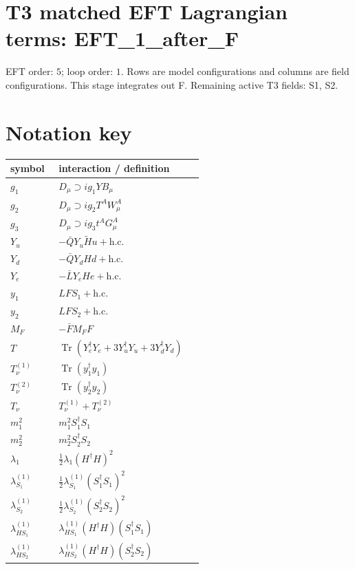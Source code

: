 \documentclass[8pt]{article}
\begin{document}
\begin{landscape}
\section*{T3 matched EFT Lagrangian terms: EFT\_1\_after\_F}
EFT order: $5$; loop order: $1$. 
Rows are model configurations and columns are field configurations. This stage integrates out F. Remaining active T3 fields: S1, S2.
\section*{Notation key}
\begin{longtable}{@{}p{0.23\linewidth}p{0.69\linewidth}@{}}
\toprule
symbol & interaction / definition \\
\midrule
$g_1$ & $D_\mu\supset i g_1YB_\mu$ \\
$g_2$ & $D_\mu\supset i g_2T^AW_\mu^A$ \\
$g_3$ & $D_\mu\supset i g_3t^AG_\mu^A$ \\
$Y_u$ & $-\bar QY_u\widetilde Hu+\mathrm{h.c.}$ \\
$Y_d$ & $-\bar QY_dHd+\mathrm{h.c.}$ \\
$Y_e$ & $-\bar LY_eHe+\mathrm{h.c.}$ \\
$y_1$ & $LFS_1+\mathrm{h.c.}$ \\
$y_2$ & $LFS_2+\mathrm{h.c.}$ \\
$M_F$ & $-\bar FM_FF$ \\
$T$ & $\operatorname{Tr}(Y_e^\dagger Y_e+3Y_u^\dagger Y_u+3Y_d^\dagger Y_d)$ \\
$T_\nu^{(1)}$ & $\operatorname{Tr}(y_1^\dagger y_1)$ \\
$T_\nu^{(2)}$ & $\operatorname{Tr}(y_2^\dagger y_2)$ \\
$T_\nu$ & $T_\nu^{(1)}+T_\nu^{(2)}$ \\
$m_1^2$ & $m_1^2S_1^\dagger S_1$ \\
$m_2^2$ & $m_2^2S_2^\dagger S_2$ \\
$\lambda_1$ & $\frac12\lambda_1(H^\dagger H)^2$ \\
$\lambda_{S_1}^{(1)}$ & $\frac12\lambda_{S_1}^{(1)}(S_1^\dagger S_1)^2$ \\
$\lambda_{S_2}^{(1)}$ & $\frac12\lambda_{S_2}^{(1)}(S_2^\dagger S_2)^2$ \\
$\lambda_{HS_1}^{(1)}$ & $\lambda_{HS_1}^{(1)}(H^\dagger H)(S_1^\dagger S_1)$ \\
$\lambda_{HS_2}^{(1)}$ & $\lambda_{HS_2}^{(1)}(H^\dagger H)(S_2^\dagger S_2)$ \\

\end{longtable}
\end{landscape}
\end{document}

